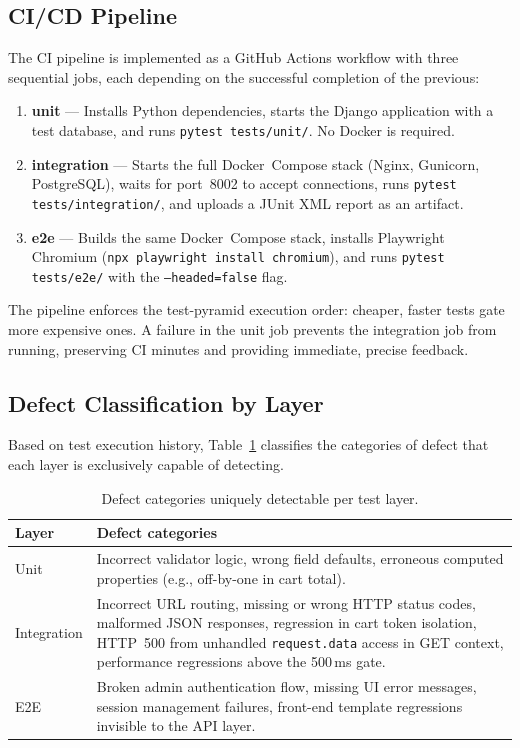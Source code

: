 \documentclass[12pt, a4paper]{article}
\begin{document}
\subsection{CI/CD Pipeline}
\label{sec:cicd}

The CI pipeline is implemented as a GitHub Actions workflow with three
sequential jobs, each depending on the successful completion of the previous:

\begin{enumerate}
    \item \textbf{unit} — Installs Python dependencies, starts the Django
    application with a test database, and runs \texttt{pytest tests/unit/}.
    No Docker is required.
    \item \textbf{integration} — Starts the full Docker~Compose stack (Nginx,
    Gunicorn, PostgreSQL), waits for port~8002 to accept connections, runs
    \texttt{pytest tests/integration/}, and uploads a JUnit XML report as an
    artifact.
    \item \textbf{e2e} — Builds the same Docker~Compose stack, installs
    Playwright Chromium (\texttt{npx playwright install chromium}), and runs
    \texttt{pytest tests/e2e/} with the \texttt{--headed=false} flag.
\end{enumerate}

The pipeline enforces the test-pyramid execution order: cheaper, faster tests
gate more expensive ones.  A failure in the unit job prevents the integration
job from running, preserving CI minutes and providing immediate, precise
feedback.

\subsection{Defect Classification by Layer}
\label{sec:defects}

Based on test execution history, Table~\ref{tab:defects} classifies the
categories of defect that each layer is exclusively capable of detecting.

\begin{table}[ht]
\centering
\caption{Defect categories uniquely detectable per test layer.}
\label{tab:defects}
\begin{tabular}{lp{9cm}}
\toprule
\textbf{Layer} & \textbf{Defect categories} \\
\midrule
Unit        & Incorrect validator logic, wrong field defaults, erroneous
              computed properties (e.g., off-by-one in cart total). \\
Integration & Incorrect URL routing, missing or wrong HTTP status codes,
              malformed JSON responses, regression in cart token isolation,
              HTTP~500 from unhandled \texttt{request.data} access in GET
              context, performance regressions above the 500\,ms gate. \\
E2E         & Broken admin authentication flow, missing UI error messages,
              session management failures, front-end template regressions
              invisible to the API layer. \\
\bottomrule
\end{tabular}
\end{table}
\end{document}
